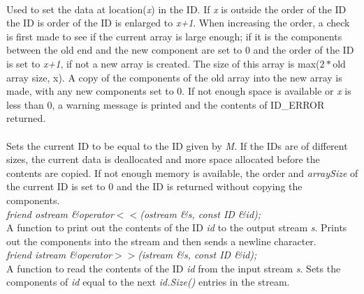 \\
Used to set the data at location({\em x}) in the ID. If {\em x} is outside
the order of the ID the ID is order of the ID is enlarged to {\em
x+1}. When increasing the order, a check is first made to see if the
current array is large enough; if it is the components between the old
end and the new component are set to $0$ and the order of the ID is set
to {\em x+1}, if not a new array is created. The size of this array is
max($2*$old array size, x). A copy of the components of the old array
into the new array is made, with any new components set to $0$. If not
enough space is available or {\em x} is less than $0$, a warning
message is printed and the contents of ID\_ERROR returned. \\


\\
Sets the current ID to be equal to the ID given by {\em M}. If the
IDs are of different sizes, the current data is deallocated and
more space allocated before the contents are copied. If not enough
memory is available, the order and {\em arraySize} of the current ID
is set to $0$ and the ID is returned without copying the components. \\


{\em friend ostream \&operator$<<$(ostream \&s, const ID \&id);} \\
A function to print out the contents of the ID {\em id} to the output stream
{\em s}. Prints out the components into the stream and then sends a
newline character. \\

{\em friend istream \&operator$>>$(istream \&s, const ID \&id);} \\
A function to read the contents of the ID {\em id} from the input
stream {\em s}. Sets the components of {\em id} equal to the next {\em
id.Size()} entries in the stream.\\ 






